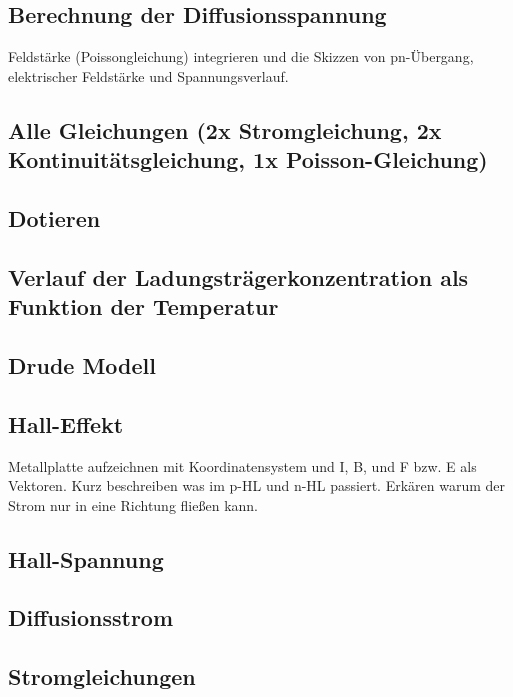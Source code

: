 
\subsection{Berechnung der Diffusionsspannung }\label{k3:diffusion}
Feldst\"arke (Poissongleichung) integrieren und die Skizzen von pn-\"Ubergang, elektrischer
Feldst\"arke und Spannungsverlauf.

\subsection{Alle Gleichungen (2x Stromgleichung, 2x Kontinuitätsgleichung, 1x Poisson-Gleichung) }\label{k3:alleGleichungen}

\subsection{Dotieren }\label{k3:dotieren}

\subsection{Verlauf der Ladungstr\"agerkonzentration als Funktion der Temperatur }\label{k3:ladungstraegerkonz}

\subsection{Drude Modell }\label{k3:drude}

\subsection{Hall-Effekt }\label{k3:halleffekt}
Metallplatte aufzeichnen mit Koordinatensystem und I, B, und F bzw. E als Vektoren.
Kurz beschreiben was im p-HL und n-HL passiert.
Erk\"aren warum der Strom nur in eine Richtung flie{\ss}en kann.

\subsection{Hall-Spannung }\label{k3:hallspannung}

\subsection{Diffusionsstrom }\label{k3:diffusionsstrom}

\subsection{Stromgleichungen }\label{k3:stromgleichungen}


